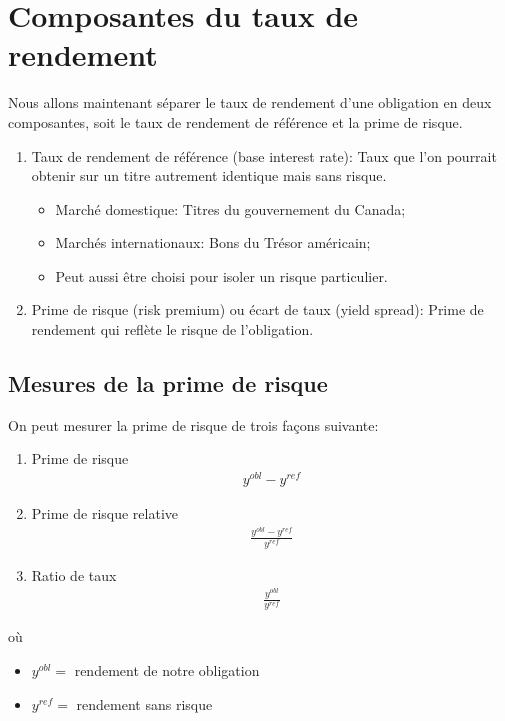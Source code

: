 \documentclass[12pt]{article}
\begin{document}
\section{Composantes du taux de rendement}
Nous allons maintenant séparer le taux de rendement d'une obligation en deux composantes,  soit le taux de rendement de référence et la prime de risque.

\begin{enumerate}
\item Taux de rendement de référence (base interest rate): Taux que l’on pourrait obtenir sur un titre autrement identique mais sans risque.
\begin{itemize}
\item Marché domestique: Titres du gouvernement du Canada;
\item Marchés internationaux: Bons du Trésor américain;
\item Peut aussi être choisi pour isoler un risque particulier.
\end{itemize}
\item Prime de risque (risk premium) ou écart de taux (yield spread): Prime de rendement qui reflète le risque de l’obligation.
\end{enumerate}
\newpage
\subsection{ Mesures de la prime de risque}
On peut mesurer la prime de risque de trois façons suivante:
\begin{enumerate}
\item Prime de risque 
\begin{align*}
y^{obl}-y^{ref}
\end{align*}
\item Prime de risque relative
\begin{align*}
\frac{y^{obl}-y^{ref}}{y^{ref}}
\end{align*}
\item Ratio de taux
\begin{align*}
\frac{y^{obl}}{y^{ref}}
\end{align*}
\end{enumerate}
où 
\begin{itemize}
\item $y^{obl}=$ rendement de notre obligation
\item $y^{ref}=$ rendement sans risque
\end{itemize}
\newpage
\end{document}
